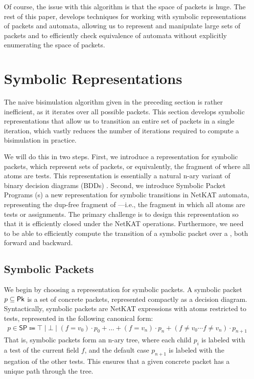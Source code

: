 \documentclass[acmsmall,dvipsnames,nonacm]{acmart}
\begin{document}
Of course, the issue with this algorithm is that the space of packets
is huge. The rest of this paper, develops techniques for working with
symbolic representations of packets and automata, allowing us to
represent and manipulate large sets of packets and to efficiently
check equivalence of automata without explicitly enumerating the space
of packets.

\section{Symbolic \NetKAT Representations}\label{sec:symbolic}

The naive bisimulation algorithm given in the preceding section is rather inefficient, as it iterates over all possible packets. This section develops symbolic representations that allow us to transition an entire set of packets in a single iteration, which vastly reduces the number of iterations required to compute a bisimulation in practice.

We will do this in two steps. First, we introduce a representation for symbolic packets, which represent sets of packets, or equivalently, the fragment of \NetKAT where all atoms are tests. This representation is essentially a natural n-ary variant of binary decision diagrams (BDDs) \cite{Bryant1992}.
Second, we introduce Symbolic Packet Programs (\SPPn{}s) a new representation for symbolic transitions in NetKAT automata, representing the $\text{dup}$-free fragment of \NetKAT---i.e., the fragment in which all atoms are tests or assignments.
The primary challenge is to design this representation so that it is efficiently closed under the NetKAT operations.
Furthermore, we need to be able to efficiently compute the transition of a symbolic packet over a \SPPn{}, both forward and backward.

\subsection{Symbolic Packets}\label{sec:sympk}

We begin by choosing a representation for symbolic packets.
A symbolic packet $p \subseteq \mathsf{Pk}$ is a set of concrete packets,
represented compactly as a decision diagram.
Syntactically, symbolic packets are NetKAT expressions with atoms restricted to tests,
represented in the following canonical form:
%
\newcommand{\SP}{\mathsf{SP}}
\begin{align*}
    p \in \SP \Coloneqq \top \mid \bot \mid (f = v_0) \cdot p_0 + \ldots + (f = v_n) \cdot p_n + (f \neq v_0 \cdots f \neq v_n) \cdot p_{n+1}
\end{align*}
That is, symbolic packets form an n-ary tree, where each child $p_i$ is labeled with a test of the current field $f$, and the default case $p_{n+1}$ is labeled with the negation of the other tests.
This ensures that a given concrete packet has a unique path through the tree.
\end{document}
